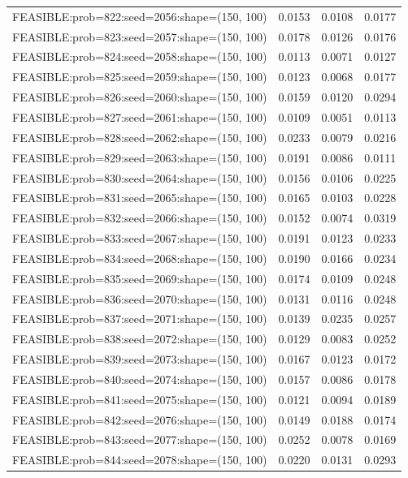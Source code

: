 \begin{longtable}{lccc}
FEASIBLE:prob=822:seed=2056:shape=(150, 100) &   0.0153 & 0.0108 & 0.0177 \\
FEASIBLE:prob=823:seed=2057:shape=(150, 100) &   0.0178 & 0.0126 & 0.0176 \\
FEASIBLE:prob=824:seed=2058:shape=(150, 100) &   0.0113 & 0.0071 & 0.0127 \\
FEASIBLE:prob=825:seed=2059:shape=(150, 100) &   0.0123 & 0.0068 & 0.0177 \\
FEASIBLE:prob=826:seed=2060:shape=(150, 100) &   0.0159 & 0.0120 & 0.0294 \\
FEASIBLE:prob=827:seed=2061:shape=(150, 100) &   0.0109 & 0.0051 & 0.0113 \\
FEASIBLE:prob=828:seed=2062:shape=(150, 100) &   0.0233 & 0.0079 & 0.0216 \\
FEASIBLE:prob=829:seed=2063:shape=(150, 100) &   0.0191 & 0.0086 & 0.0111 \\
FEASIBLE:prob=830:seed=2064:shape=(150, 100) &   0.0156 & 0.0106 & 0.0225 \\
FEASIBLE:prob=831:seed=2065:shape=(150, 100) &   0.0165 & 0.0103 & 0.0228 \\
FEASIBLE:prob=832:seed=2066:shape=(150, 100) &   0.0152 & 0.0074 & 0.0319 \\
FEASIBLE:prob=833:seed=2067:shape=(150, 100) &   0.0191 & 0.0123 & 0.0233 \\
FEASIBLE:prob=834:seed=2068:shape=(150, 100) &   0.0190 & 0.0166 & 0.0234 \\
FEASIBLE:prob=835:seed=2069:shape=(150, 100) &   0.0174 & 0.0109 & 0.0248 \\
FEASIBLE:prob=836:seed=2070:shape=(150, 100) &   0.0131 & 0.0116 & 0.0248 \\
FEASIBLE:prob=837:seed=2071:shape=(150, 100) &   0.0139 & 0.0235 & 0.0257 \\
FEASIBLE:prob=838:seed=2072:shape=(150, 100) &   0.0129 & 0.0083 & 0.0252 \\
FEASIBLE:prob=839:seed=2073:shape=(150, 100) &   0.0167 & 0.0123 & 0.0172 \\
FEASIBLE:prob=840:seed=2074:shape=(150, 100) &   0.0157 & 0.0086 & 0.0178 \\
FEASIBLE:prob=841:seed=2075:shape=(150, 100) &   0.0121 & 0.0094 & 0.0189 \\
FEASIBLE:prob=842:seed=2076:shape=(150, 100) &   0.0149 & 0.0188 & 0.0174 \\
FEASIBLE:prob=843:seed=2077:shape=(150, 100) &   0.0252 & 0.0078 & 0.0169 \\
FEASIBLE:prob=844:seed=2078:shape=(150, 100) &   0.0220 & 0.0131 & 0.0293 \\

\end{longtable}
